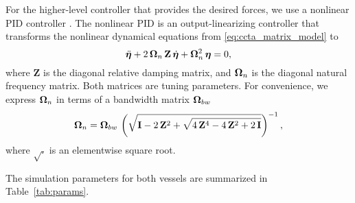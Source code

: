 For the higher-level controller that provides the desired forces, we use a nonlinear PID controller \cite{fossen_handbook_2011}.
The nonlinear PID is an output-linearizing controller that transforms the nonlinear dynamical equations from \eqref{eq:ccta_matrix_model} to
\begin{equation}
    \ddot{\bm{\eta}} + 2\,\bm{\Omega}_n\,\mathbf{Z}\,\dot{\bm{\eta}} + \bm{\Omega}_n^2\,\bm{\eta} = 0,
\end{equation}
where $\mathbf{Z}$ is the diagonal relative damping matrix, and $\bm{\Omega}_n$ is the diagonal natural frequency matrix.
Both matrices are tuning parameters.
For convenience, we express $\bm{\Omega}_n$ in terms of a bandwidth matrix $\bm{\Omega}_{bw}$
\begin{equation}
    \bm{\Omega}_n = \bm{\Omega}_{bw} \, \left(\sqrt{\mathbf{I} - 2\,\mathbf{Z}^2 + \sqrt{4\,\mathbf{Z}^4 - 4\,\mathbf{Z}^2 + 2\,\mathbf{I}}}\right)^{-1},
\end{equation}
where $\sqrt{.}$ is an elementwise square root.

The simulation parameters for both vessels are summarized in Table~\ref{tab:params}.

